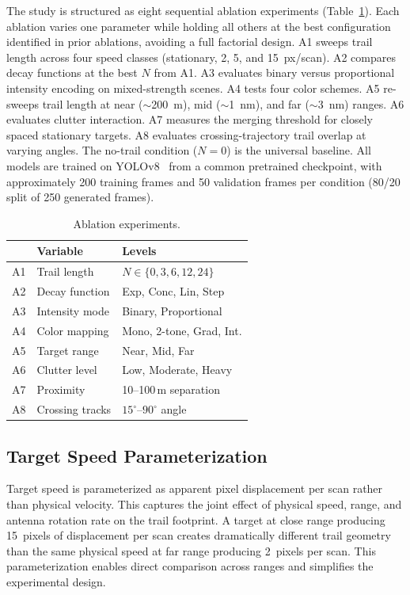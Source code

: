 \documentclass[colorlinks,upint,balance]{asmeconf}
\begin{document}
The study is structured as eight sequential ablation experiments (Table~\ref{tab:ablations}). Each ablation varies one parameter while holding all others at the best configuration identified in prior ablations, avoiding a full factorial design. A1 sweeps trail length across four speed classes (stationary, 2, 5, and 15~px/scan). A2 compares decay functions at the best $N$ from A1. A3 evaluates binary versus proportional intensity encoding on mixed-strength scenes. A4 tests four color schemes. A5 re-sweeps trail length at near ($\sim$200~m), mid ($\sim$1~nm), and far ($\sim$3~nm) ranges. A6 evaluates clutter interaction. A7 measures the merging threshold for closely spaced stationary targets. A8 evaluates crossing-trajectory trail overlap at varying angles. The no-trail condition ($N=0$) is the universal baseline. All models are trained on YOLOv8~\cite{Jocher2023YOLOv8} from a common pretrained checkpoint, with approximately 200 training frames and 50 validation frames per condition (80/20 split of 250 generated frames).

\begin{table}[t]
\caption{Ablation experiments.}
\label{tab:ablations}
\centering
\footnotesize
\begin{tabular}{@{}lll@{}}
\toprule
 & \textbf{Variable} & \textbf{Levels} \\
\midrule
A1 & Trail length & $N \in \{0,3,6,12,24\}$ \\
A2 & Decay function & Exp, Conc, Lin, Step \\
A3 & Intensity mode & Binary, Proportional \\
A4 & Color mapping & Mono, 2-tone, Grad, Int. \\
A5 & Target range & Near, Mid, Far \\
A6 & Clutter level & Low, Moderate, Heavy \\
A7 & Proximity & 10--100\,m separation \\
A8 & Crossing tracks & $15^\circ$--$90^\circ$ angle \\
\bottomrule
\end{tabular}
\end{table}

\subsection{Target Speed Parameterization}

Target speed is parameterized as apparent pixel displacement per scan rather than physical velocity. This captures the joint effect of physical speed, range, and antenna rotation rate on the trail footprint. A target at close range producing 15~pixels of displacement per scan creates dramatically different trail geometry than the same physical speed at far range producing 2~pixels per scan. This parameterization enables direct comparison across ranges and simplifies the experimental design.
\end{document}

